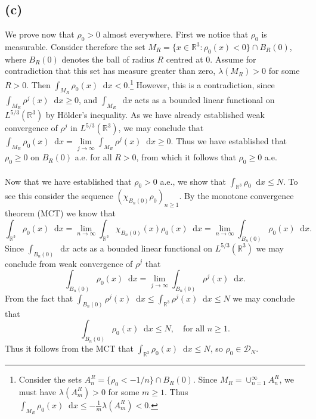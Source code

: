 \documentclass[a4paper,11pt]{article}
\newcommand*\diff{\mathop{}\!\mathrm{d}}
\newcommand{\R}{\mathbb{R}}
\numberwithin{equation}{section}
\begin{document}
\subsection*{(c)}
We prove now that $ \rho_0>0 $ almost everywhere. First we notice that $ \rho_0 $ is measurable. Consider therefore the set $ M_R=\{x\in\R^3 : \rho_0(x)<0\}\cap B_R(0) $, where $ B_R(0) $ denotes the ball of radius $ R $ centred at $ 0 $. Assume for contradiction that this set has measure greater than zero, $ \lambda(M_R)>0 $ for some $ R>0 $. Then $ \int_{M_R}\rho_0(x) \diff x <0$.\footnote{Consider the sets $ A^R_n=\{\rho_0<-1/n\}\cap B_R(0) $. Since $ M_R=\cup_{n=1}^{\infty}A_n^R $, we must have $ \lambda(A_m^R)>0 $ for some $ m\geq1 $. Thus $ \int_{M_R}\rho_0(x)\diff x\leq-\frac{1}{m}\lambda(A_m^R)<0 $.} However, this is a contradiction, since $ \int_{M_R}\rho^j(x) \diff x\geq0 $, and $ \int_{M_R} \diff x $ acts as a bounded linear functional on $ L^{5/3}(\R^3) $ by H\"older's inequality. As we have already established weak convergence of $ \rho^j $ in $ L^{5/3}(\R^3) $, we may conclude that $ \int_{M_R}\rho_0(x) \diff x=\lim\limits_{j\to\infty}\int_{M_R}\rho^j(x) \diff x\geq0 $. Thus we have established that $ \rho_0\geq0 $ on $ B_R(0) $ a.e. for all $ R>0 $, from which it follows that $ \rho_0\geq0 $ a.e.\\
\\
Now that we have established that $ \rho_0>0 $ a.e., we show that $ \int_{\R^3}\rho_0 \diff x \leq N $. To see this consider the sequence $( \chi_{B_n(0)}\rho_0)_{n\geq1} $. By the monotone convergence theorem (MCT) we know that \begin{equation}
\int_{\R^3}\rho_0(x) \diff x=\lim\limits_{n\to\infty}\int_{\R^3}\chi_{B_n(0)}(x)\rho_0(x) \diff x=\lim\limits_{n\to\infty}\int_{B_n(0)}\rho_0(x)\diff x.
\end{equation}
Since $ \int_{B_n(0)}\diff x $ acts as a bounded linear functional on $ L^{5/3}(\R^3) $ we may conclude from weak convergence of $ \rho^j $ that \begin{equation}
\int_{B_n(0)}\rho_0(x)\diff x=\lim\limits_{j\to\infty}\int_{B_n(0)}\rho^j(x)\diff x.
\end{equation}
From the fact that $ \int_{B_n(0)}\rho^j(x)\diff x\leq\int_{\R^3}\rho^j(x)\diff x\leq N $ we may conclude that \begin{equation}
\int_{B_n(0)}\rho_0(x)\diff x\leq N,\quad \text{for all }n\geq1.
\end{equation}
Thus it follows from the MCT that $ \int_{\R^3}\rho_0(x)\diff x\leq N $, so $ \rho_0\in\mathcal{D}_N $.
\end{document}
